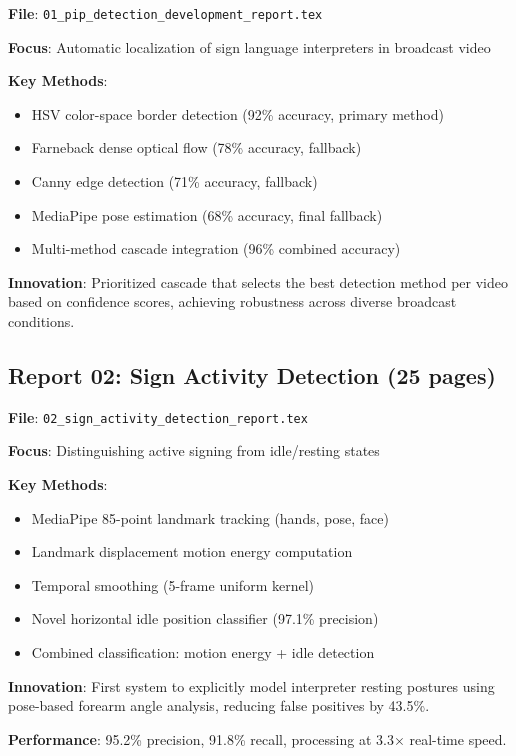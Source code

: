 \documentclass[11pt,a4paper]{article}
\begin{document}
\textbf{File}: \texttt{01\_pip\_detection\_development\_report.tex}

\textbf{Focus}: Automatic localization of sign language interpreters in broadcast video

\textbf{Key Methods}:
\begin{itemize}
    \item HSV color-space border detection (92\% accuracy, primary method)
    \item Farneback dense optical flow (78\% accuracy, fallback)
    \item Canny edge detection (71\% accuracy, fallback)
    \item MediaPipe pose estimation (68\% accuracy, final fallback)
    \item Multi-method cascade integration (96\% combined accuracy)
\end{itemize}

\textbf{Innovation}: Prioritized cascade that selects the best detection method per video based on confidence scores, achieving robustness across diverse broadcast conditions.

\subsection{Report 02: Sign Activity Detection (25 pages)}

\textbf{File}: \texttt{02\_sign\_activity\_detection\_report.tex}

\textbf{Focus}: Distinguishing active signing from idle/resting states

\textbf{Key Methods}:
\begin{itemize}
    \item MediaPipe 85-point landmark tracking (hands, pose, face)
    \item Landmark displacement motion energy computation
    \item Temporal smoothing (5-frame uniform kernel)
    \item Novel horizontal idle position classifier (97.1\% precision)
    \item Combined classification: motion energy + idle detection
\end{itemize}

\textbf{Innovation}: First system to explicitly model interpreter resting postures using pose-based forearm angle analysis, reducing false positives by 43.5\%.

\textbf{Performance}: 95.2\% precision, 91.8\% recall, processing at 3.3$\times$ real-time speed.
\end{document}
